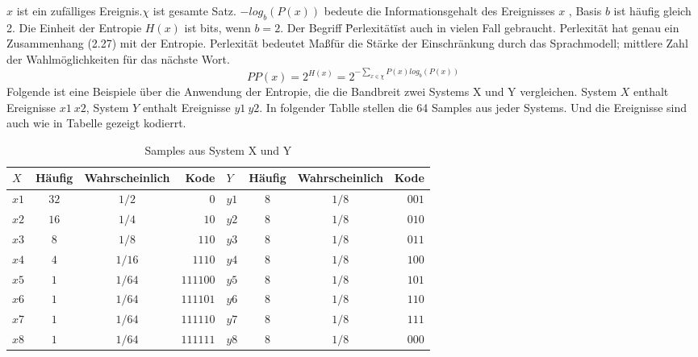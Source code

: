 $x$ ist ein zuf\"alliges Ereignis.$\chi$ ist gesamte Satz. $-log_{b}(P(x))$ bedeute die Informationsgehalt des Ereignisses $x$ , Basis $b$ ist h\"aufig gleich 2. Die Einheit der Entropie $H(x)$ ist bits, wenn $b=2$.
Der Begriff \"Perlexit\"at\" ist auch in vielen Fall gebraucht. Perlexit\"at hat genau ein Zusammenhang (2.27) mit der Entropie. Perlexit\"at bedeutet Ma\ss f\"ur die St\"arke der Einschr\"ankung durch das Sprachmodell; mittlere Zahl der Wahlm\"oglichkeiten f\"ur das n\"achste Wort.
\begin{equation}
\label{equation:bewertung_02}
PP(x)=2^{H(x)}=2^{-\sum_{x\in\chi}P(x)log_{b}(P(x))}
\end{equation}
Folgende ist eine Beispiele \"uber die Anwendung der Entropie, die die Bandbreit zwei Systems X und Y vergleichen. System $X$ enthalt Ereignisse $x1~x2$, System $Y$ enthalt Ereignisse $y1~y2$. In folgender Tablle stellen die 64 Samples aus jeder Systems. Und die Ereignisse sind auch wie in Tabelle gezeigt kodierrt.
\begin{table}[h]
  \begin{center}
    \begin{tabular}{lccrlccr}
      \toprule
      \bf $X$ & \bf H\"aufig & \bf Wahrscheinlich & \bf Kode 
   	& \bf $Y$ & \bf H\"aufig & \bf Wahrscheinlich & \bf Kode\\    
      \midrule     
      $x1$ 		&  $32$ 		 	& $1/2$  							& $0$	
    & $y1$		&  $8$ 		 		& $1/8$  							& $001$	\\
      $x2$ 		&  $16$ 			& $1/4$  							& $10$
    & $y2$		&  $8$ 		 		& $1/8$  							& $010$	\\
     	$x3$ 		&  $8$ 		 		& $1/8$  							& $110$	
    & $y3$		&  $8$ 		 		& $1/8$  							& $011$	\\
      $x4$ 		&  $4$ 				& $1/16$  						& $1110$
    & $y4$		&  $8$ 		 		& $1/8$  							& $100$	\\
     	$x5$ 		&  $1$ 		 		& $1/64$   						& $111100$	
    & $y5$		&  $8$ 		 		& $1/8$  							& $101$	\\
      $x6$ 		&  $1$ 				& $1/64$  						& $111101$
   	& $y6$		&  $8$ 		 		& $1/8$  							& $110$	\\
     	$x7$ 		&  $1$ 		 		& $1/64$  						& $111110$	
    & $y7$		&  $8$ 		 		& $1/8$  							& $111$	\\
      $x8$ 		&  $1$ 				& $1/64$  						& $111111$
    & $y8$		&  $8$ 		 		& $1/8$  							& $000$	\\     
      \bottomrule
    \end{tabular}
  \end{center}
\caption{Samples aus System X und Y}
\label{tab:table_2}
\end{table}

